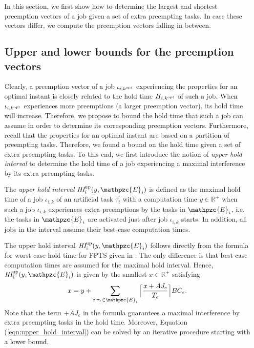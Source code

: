 In this section, we first show how to determine the largest and shortest preemption vectors of a job given a set of extra preempting tasks. In case these vectors differ, we compute the preemption vectors falling in between.

\subsection{Upper and lower bounds for the preemption vectors}
Clearly, a preemption vector of a job $\iota_{i,k^{\rm{opt}}}$ experiencing the properties for an optimal instant is closely related to the hold time $H_{i,k^{\rm{opt}}}$ of such a job. When $\iota_{i,k^{\rm{opt}}}$ experiences more preemptions (a larger preemption vector), its hold time will increase. Therefore, we propose to bound the hold time that such a job can assume in order to determine its corresponding preemption vectors. Furthermore, recall that the properties for an optimal instant are based on a partition of preempting tasks. Therefore, we found a bound on the hold time given a set of extra preempting tasks. To this end, we first introduce the notion of \textit{upper hold interval} to determine the hold time of a job experiencing a maximal interference by its extra preempting tasks.


\begin{definition}
The \textit{upper hold interval} $\hi^{\rm{up}}_i(y,\mathpzc{E}_i)$ is defined as the maximal hold time of a job $\iota_{i,k}$ of an artificial task $\tau^{\prime}_i$ with a computation time $y \in \mathbb{R}^+$ when such a job $\iota_{i,k}$ experiences extra preemptions by the tasks in $\mathpzc{E}_i$, i.e. the tasks in  $\mathpzc{E}_i$ are activated just after job $\iota_{i,k}$ starts. In addition, all jobs in the interval assume their best-case computation times.
\end{definition}

The {upper hold interval} $\hi^{\rm{up}}_i(y,\mathpzc{E}_i)$ follows directly from the formula for {worst-case hold time} for FPTS given in \cite{BAHDB17}. The only difference is that best-case computation times are assumed for the {maximal hold interval}. Hence, $\hi^{\rm{up}}_i(y,\mathpzc{E}_i)$ is given by the smallest $x \in \mathbb{R}^+$ satisfying
\begin{align}\label{eqn:upper_hold_interval}
x = y + \sum\limits_{e:\tau_e \in \mathpzc{E}_i}\Big\lceil  \dfrac{x+ \aj_e}{T_e}\Big\rceil  BC_e.
\end{align}
Note that the term $+AJ_e$ in the formula guarantees a maximal interference by extra preempting tasks in the hold time. Moreover, Equation (\ref{eqn:upper_hold_interval}) can be solved by an iterative procedure starting with a lower bound.

